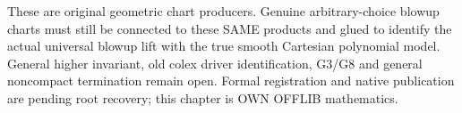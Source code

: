 These are original geometric chart producers. Genuine arbitrary-choice blowup charts must still be connected to these SAME products and glued to identify the actual universal blowup lift with the true smooth Cartesian polynomial model. General higher invariant, old colex driver identification, G3/G8 and general noncompact termination remain open. Formal registration and native publication are pending root recovery; this chapter is OWN OFFLIB mathematics.
